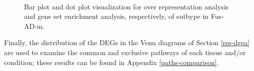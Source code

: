 \begin{figure}[!ht]%
    \centering
    \qquad
    \\
    \qquad
\caption{Bar plot and dot plot visualization for over representation analysis and gene set enrichment analysis, respectively, of sutbype in Fus-AD-m.}
\label{fig:path-fus-m-sub}%
\end{figure}

Finally, the distribution of the DEGs in the Venn diagrams of Section \ref{res-dgea} are used to examine the common and exclusive pathways of each tissue and/or condition; these results can be found in Appendix \ref{paths-comparison}. 

